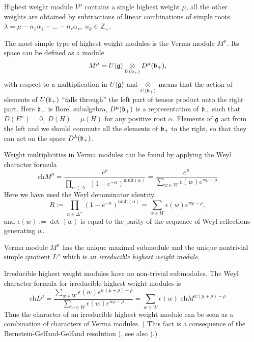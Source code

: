 Highest weight module $V^{\mu}$ contains a single highest weight $\mu$, all the other weights are obtained by subtractions of linear combinations of simple roots $\lambda=\mu-n_{1}\alpha_{1}-\dots-n_{r}\alpha_{r},\; n_{k}\in \mathbb{Z} _{+}$.

The most simple type of highest weight modules is the Verma module
$M^{\mu}$. Its space can be defined as a module
\begin{equation}
  \label{eq:17}
  M^{\mu}=U(\mathfrak{g})\underset{U(\mathfrak{b}_{+})}{\otimes} D^{\mu}(\mathfrak{b}_{+}),
\end{equation}
with respect to a multiplication in $U(\mathfrak{g})$ and
$\underset{U(\mathfrak{b}_{+})}{\otimes}$ means that the action of elements of $U(\mathfrak{b}_{+})$ ``falls through'' the left part of tensor product onto the right part. Here $\mathfrak{b}_{+}$ is Borel subalgebra, $D^{\mu}(\mathfrak{b}_{+})$ is a representation of $\mathfrak{b}_{+}$ such that $D(E^{\alpha})=0,\; D(H)=\mu(H)$ for any positive root $\alpha$.
Elements of $\mathfrak{g}$ act from the left and we should commute all the elements of $\mathfrak{b}_{+}$ to the right, so that they can act on the space $D^{\lambda}(\mathfrak{b}_{+})$.

Weight multiplicities in Verma modules can be found by applying the Weyl
character formula
\begin{equation}
  \label{eq:11}
  \mathrm{ch} M^{\mu}=\frac{e^{\mu}}{\prod_{\alpha\in \Delta^{+}} \left( 1-e^{-\alpha}\right)^{\mathrm{mult}(\alpha)}}=\frac{e^{\mu}}{\sum_{w\in W} \epsilon(w) e^{w\rho-\rho}}
\end{equation}
Here we have used the Weyl denominator identity
\begin{equation}
  \label{eq:12}
  R:=\prod_{\alpha\in \Delta^{+}} \left( 1-e^{-\alpha}\right)^{\mathrm{mult}(\alpha)}=\sum_{w\in W} \epsilon(w) e^{w\rho-\rho},
\end{equation}
and $\epsilon \left( w\right) :=\det \left( w\right)$ is equal to 
the parity of the sequence of Weyl reflections generating $w$.

Verma module $M^{\mu}$ has the unique maximal submodule and the
unique nontrivial simple quotient $L^{\mu}$ which is an
{\it irreducible highest weight module}. 

Irreducible highest weight modules have no non-trivial submodules. 
The Weyl character formula for
irreducible highest weight modules is
\begin{equation}
  \label{eq:13}
  \mathrm{ch} L^{\mu}=\frac{\sum_{w\in W} \epsilon(w) e^{w(\mu+\rho)-\rho}}{\sum_{w\in W}\epsilon(w) e^{w\rho-\rho}}=\sum_{w\in W} \epsilon(w)\; \mathrm{ch} M^{w(\mu+\rho)-\rho}
\end{equation}
Thus the character of an irreducible highest weight module can be
seen as a combination of characters of Verma modules. ( This
fact is a consequence of the Bernstein-Gelfand-Gelfand resolution
(\cite{bernstein1976category,bernstein1971structure}, see also
\cite{humphreys2008representations}).)

